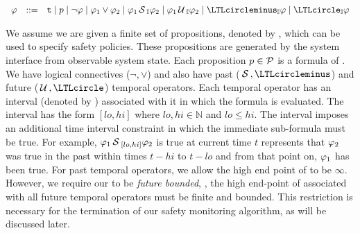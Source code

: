 

\(
\begin{array}{ccc}
\policy & ::=  & \true \mid p \mid \neg \policy \mid \policy_1\vee \policy_2\mid
\policy_1\since_{\interval}\policy_2 \mid \policy_1\until_{\interval}\policy_2\mid\yesterday_{\interval}\policy\mid \tomorrow_{\interval}\policy
\end{array}
\)


We assume we are given a finite set of propositions, denoted by \cP, which can be used to specify safety policies. 
These propositions are generated by the system interface from observable system state.
Each proposition $p\in\mathcal{P}$ is a formula of \planguage. 
We have logical connectives ($\neg, \vee$) and also have past ($\since, \yesterday$) and future ($\until, \tomorrow$) temporal operators. 
Each temporal operator has an interval (denoted by \interval) associated with it in which the formula is evaluated. 
The interval has the form $[lo, hi]$ where $lo, hi\in\mathbb{N}$ and $lo\leq hi$. 
The interval imposes an additional time interval constraint in which the immediate sub-formula must be true. 
For example, $\varphi_1\,\mathrm{\cal S}\,_{[lo, hi]}\varphi_2$ is true at current time $t$ represents that $\varphi_2$ was true in the past within times $t-hi$ to $t-lo$  and from that point on, $\varphi_1$ has been true. 
For past temporal operators, we allow the high end point of \interval to be $\infty$. 
However, we require our \policy to be \emph{future bounded}, \ie, the high end-point of \interval associated with all future temporal operators must be finite and bounded. 
This restriction is necessary for the termination of our safety monitoring algorithm, as will be discussed later. 

